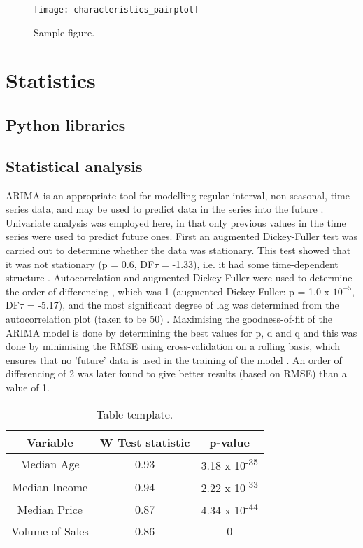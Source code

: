 \documentclass[hidelinks,12pt,oneside]{report} %
\begin{document}
\begin{figure}[!ht]
	\centering
	\vspace{.4218cm}
		\texttt{[image: characteristics\_pairplot]}	\captionsetup{justification=justified,width=1\linewidth}
	\caption{Sample figure.}
\label{fig:characteristics_pairplot}
\end{figure}



\section{Statistics}
\subsection{Python libraries}


\subsection{Statistical analysis}
ARIMA is an appropriate tool for modelling regular-interval, non-seasonal, time-series data, and may be used to predict data in the series into the future \citep{MSc}. Univariate analysis was employed here, in that only previous values in the time series were used to predict future ones. First an augmented Dickey-Fuller test was carried out to determine whether the data was stationary. This test showed that it was not stationary (p = 0.6, DF$\tau$ = -1.33), i.e. it had some time-dependent structure \citep{DF}. Autocorrelation and augmented Dickey-Fuller were used to determine the order of differencing \citep{Raval}, which was 1 (augmented Dickey-Fuller: p = 1.0 x $10^{-5}$, DF$\tau$ = -5.17), and the most significant degree of lag was determined from the autocorrelation plot (taken to be 50) \citep{Raval, Nadeem}. Maximising the goodness-of-fit of the ARIMA model is done by determining the best values for p, d and q and this was done by minimising the RMSE \citep{Raval, SaS} using cross-validation on a rolling basis, which ensures that no 'future' data is used in the training of the model \citep{SS, Hyn}. An order of differencing of 2 was later found to give better results (based on RMSE) than a value of 1.

\begin{table}[h!]
\centering
\begin{tabular}{||c | c | c ||} 
 \hline
 Variable & W Test statistic & p-value \\ [0.0ex] 
 \hline\hline
 Median Age & 0.93 & 3.18 x 10\textsuperscript{-35} \\ 
 \hline
 Median Income & 0.94 & 2.22 x 10\textsuperscript{-33} \\
 \hline
 Median Price & 0.87 & 4.34 x 10\textsuperscript{-44} \\
 \hline
  Volume of Sales & 0.86 & 0 \\ [0.0ex] 
 \hline
\end{tabular}
\caption{Table template.}
\label{table:1}
\end{table}
\end{document}
